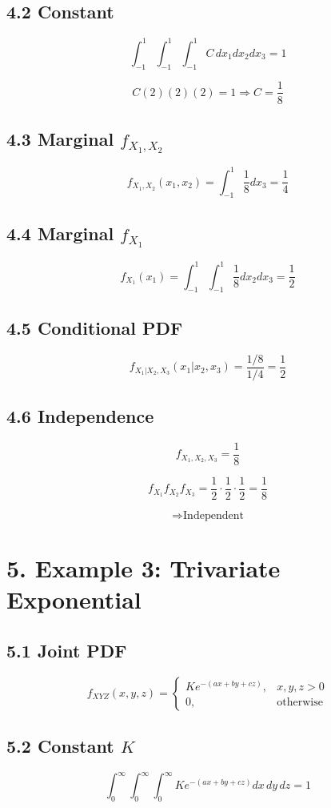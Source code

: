 \documentclass[12pt]{article}
\begin{document}
\subsection*{4.2 Constant}
\[
\int_{-1}^{1}\int_{-1}^{1}\int_{-1}^{1} C\,dx_1dx_2dx_3 = 1
\]

\[
C(2)(2)(2) = 1 \Rightarrow C = \frac{1}{8}
\]

\subsection*{4.3 Marginal $f_{X_1,X_2}$}
\[
f_{X_1,X_2}(x_1,x_2)
=
\int_{-1}^{1} \frac{1}{8} dx_3
=
\frac{1}{4}
\]

\subsection*{4.4 Marginal $f_{X_1}$}
\[
f_{X_1}(x_1)
=
\int_{-1}^{1}\int_{-1}^{1} \frac{1}{8} dx_2 dx_3
=
\frac{1}{2}
\]

\subsection*{4.5 Conditional PDF}
\[
f_{X_1|X_2,X_3}(x_1|x_2,x_3)
=
\frac{1/8}{1/4}
=
\frac{1}{2}
\]

\subsection*{4.6 Independence}
\[
f_{X_1,X_2,X_3} = \frac{1}{8}
\]

\[
f_{X_1}f_{X_2}f_{X_3} = \frac{1}{2}\cdot\frac{1}{2}\cdot\frac{1}{2} = \frac{1}{8}
\]

\[
\Rightarrow \text{Independent}
\]

\section*{5. Example 3: Trivariate Exponential}

\subsection*{5.1 Joint PDF}
\[
f_{XYZ}(x,y,z)
=
\begin{cases}
K e^{-(ax+by+cz)}, & x,y,z>0 \\
0, & \text{otherwise}
\end{cases}
\]

\subsection*{5.2 Constant $K$}
\[
\int_0^\infty\int_0^\infty\int_0^\infty
K e^{-(ax+by+cz)} dx\,dy\,dz = 1
\]
\end{document}
